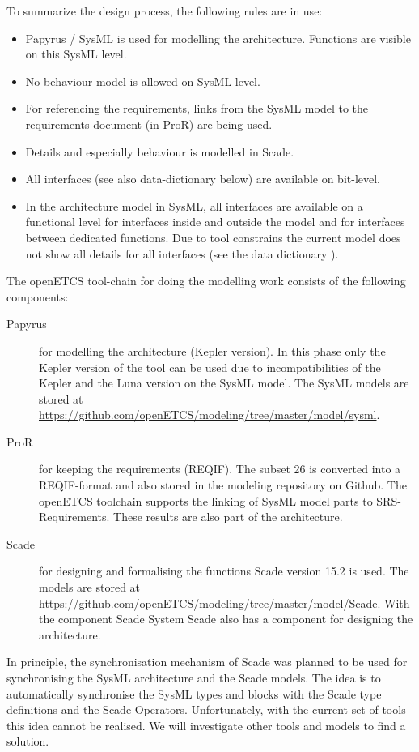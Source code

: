\documentclass{template/openetcs_report}
\begin{document}
To summarize the design process, the following rules are in use:
\begin{itemize}
\item Papyrus / SysML is used for modelling the architecture. Functions are visible on this SysML level.
\item No behaviour model is allowed on SysML level.
\item For referencing the requirements, links from the SysML model to the requirements document (in ProR) are being used.
\item Details and especially behaviour is modelled in Scade.
\item All interfaces (see also data-dictionary below) are available on bit-level.
\item In the architecture model in SysML, all interfaces are available on a functional level for interfaces inside and outside the model and for interfaces between dedicated functions. Due to tool constrains the current model does not show all details for all interfaces (see the data dictionary \cite{dataDictionary}).
\end{itemize}

The openETCS tool-chain for doing the modelling work consists of the following components:
\begin{description}
	\item[Papyrus] for modelling the architecture (Kepler version).
	In this phase only the Kepler version of the tool can be used due to incompatibilities of the Kepler and the Luna version on the SysML model. The SysML models are stored at \url{https://github.com/openETCS/modeling/tree/master/model/sysml}.
	\item[ProR] for keeping the requirements (REQIF).
	The subset 26 is converted into a REQIF-format and also stored in the modeling repository on Github. The openETCS toolchain supports the linking of SysML model parts to SRS-Requirements. These results are also part of the architecture.
	\item[Scade] for designing and formalising the functions Scade version 15.2 is used.
	The models are stored at \url{https://github.com/openETCS/modeling/tree/master/model/Scade}.
	With the component Scade System Scade also has a component for designing the architecture.
\end{description}

In principle, the synchronisation mechanism of Scade was planned to be used for synchronising the SysML architecture and the Scade models. The idea is to automatically synchronise the SysML types and blocks with the Scade type definitions and the Scade Operators. Unfortunately, with the current set of tools this idea cannot be realised. We will investigate other tools and models to find a solution. 
\end{document}
